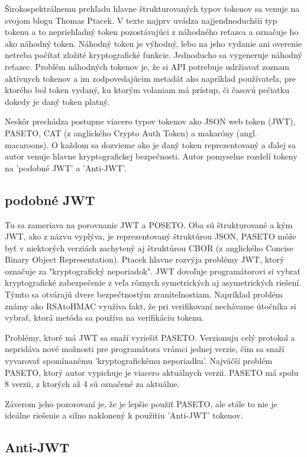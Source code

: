 Širokospektrálnemu prehľadu hlavne štrukturovaných typov tokenov sa venuje na svojom blogu \cite{tokens_comparison} Thomas Ptacek. V texte najprv uvádza najjendnoduchšii typ tokenu a to nepriehľadný token pozostávajúci z náhodného reťazca a označuje ho ako náhodný token. Náhodný token je výhodný, lebo na jeho vydanie ani overenie netreba počítať zložité kryptografické funkcie. Jednoducho sa vygeneruje náhodný reťazec. Problém náhodných tokenov je, že si API potrebuje udržiavať zoznam aktívnych tokenov a im zodpovedajúcim metadát ako napríklad používateľa, pre ktorého bol token vydaný, ku ktorým volaniam má prístup, či časovú pečiatku dokedy je daný token platný.

Neskôr prechádza postupne viacero typov tokenov ako JSON web token (JWT), PASETO, CAT (z anglického Crypto Auth Token) a makaróny (angl. macaroons). O každom sa dozvieme ako je daný token reprezentovaný a ďalej sa autor venuje hlavne kryptografickej bezpečnosti. Autor pomyselne rozdelí tokeny na 'podobné JWT' a 'Anti-JWT'.

\subsection{podobné JWT}

Tu sa zameriava na porovnanie JWT a POSETO. Oba sú štrukturované a kým JWT, ako z názvu vyplýva, je reprezentovaný štruktúrou JSON, PASETO môže byť v niektorých verziách zachytený aj štruktúrou CBOR (z anglického Concise Binary Object Representation). Ptacek hlavne rozvýja problémy JWT, ktorý označuje za "kryptografický neporiadok". JWT dovoľuje programátorovi si vybrať kryptografické zabezpečenie z veľa rôznych symetrických aj asymetrických riešení. Týmto sa otvárajú dvere bezpečtnostým zraniteľnostiam. Napríklad problém známy ako RSAtoHMAC \cite{vulnerabilities} využíva fakt, že pri verifikovaní nechávame útočníka si vybrať, ktorá metóda sa používa na verifikáciu tokenu.

Problémy, ktoré má JWT sa snaží vyriešiť PASETO. Verzionuju celý protokol a nepridáva nové možnosti pre programátora vrámci jednej verzie, čím sa snaží vyvarovať spomínanému 'kryptografickému neporiadku'. Najväčší problém PASETO, ktorý autor vypichuje je viacero aktuálnych verzii. PASETO má spolu 8 verzii, z ktorých až 4 sú označené za aktuálne.

Záverom jeho pozorovaní je, že je lepšie použiť PASETO, ale stále to nie je ideálne riešenie a silno naklonený k použitiu 'Anti-JWT' tokenov.

\subsection{Anti-JWT}

